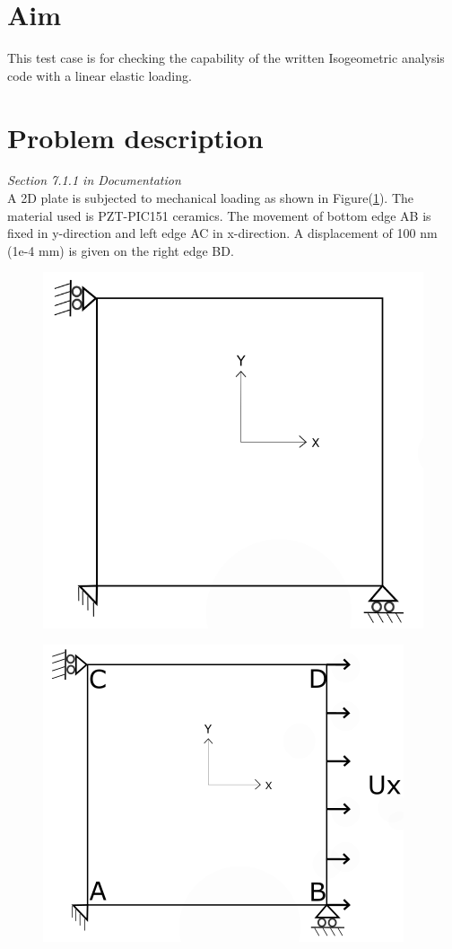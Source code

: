 \documentclass[12pt]{article}
\begin{document}
\section{Aim}
This test case is for checking the capability of the written Isogeometric analysis code with a linear elastic loading.
\section{Problem description} \label{2DPWLELPD}
\emph{Section 7.1.1 in Documentation}\\
A 2D plate is subjected to mechanical loading as shown in Figure(\ref{XYLoading}). The material used is PZT-PIC151 ceramics.
The movement of bottom edge AB is fixed in y-direction and left edge AC in x-direction. A displacement of 100 nm (1e-4 mm) is given on the right edge BD.
\begin{figure}[H]
	\centering
	\begin{minipage}{.5\textwidth}
		\centering
		\includegraphics[width=0.8\linewidth]{2DPlate.png}
		\label{2Dplate}
	\end{minipage}%
	\begin{minipage}{.5\textwidth}
		\centering
		\includegraphics[width=0.9\linewidth]{XYLoading.png}
		\label{XYLoading}
	\end{minipage}
\end{figure}
\newpage
\end{document}
